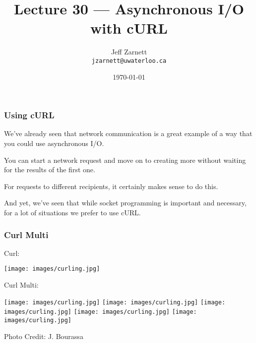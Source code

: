 

\title{Lecture 30 --- Asynchronous I/O with cURL }

\author{Jeff Zarnett \\ \small \texttt{jzarnett@uwaterloo.ca}}
\date{\today}




\begin{frame}
	\titlepage

\end{frame}

\begin{frame}
	\frametitle{Using cURL}

	We've already seen that network communication is a great example of a way that you could use asynchronous I/O.

	You can start a network request and move on to creating more without waiting for the results of the first one.

	For requests to different recipients, it certainly makes sense to do this.

	And yet, we've seen that while socket programming is important and necessary, for a lot of situations we prefer to use cURL.

\end{frame}


\begin{frame}
	\frametitle{Curl Multi}

	Curl:
	\begin{center}
		\texttt{[image: images/curling.jpg]}
	\end{center}

	Curl Multi:
	\begin{center}
		\texttt{[image: images/curling.jpg]}
		\texttt{[image: images/curling.jpg]}
		\texttt{[image: images/curling.jpg]}
		\texttt{[image: images/curling.jpg]}
		\texttt{[image: images/curling.jpg]}
	\end{center}

	\hfill Photo Credit: J. Bourassa

\end{frame}

